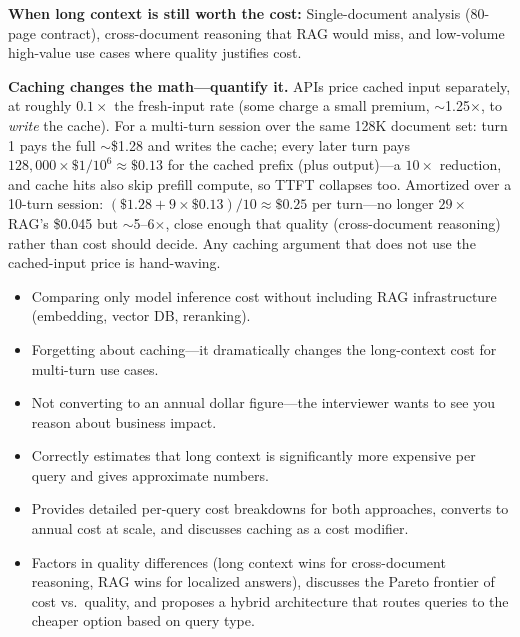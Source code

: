\begin{interviewq}
\textbf{When long context is still worth the cost:} Single-document analysis (80-page contract), cross-document reasoning that RAG would miss, and low-volume high-value use cases where quality justifies cost.

\textbf{Caching changes the math---quantify it.} APIs price cached input separately, at roughly $0.1\times$ the fresh-input rate (some charge a small premium, $\sim$1.25$\times$, to \textit{write} the cache). For a multi-turn session over the same 128K document set: turn 1 pays the full $\sim$\$1.28 and writes the cache; every later turn pays $128{,}000 \times \$1/10^6 \approx \$0.13$ for the cached prefix (plus output)---a $10\times$ reduction, and cache hits also skip prefill compute, so TTFT collapses too. Amortized over a 10-turn session: $(\$1.28 + 9 \times \$0.13)/10 \approx \$0.25$ per turn---no longer $29\times$ RAG's \$0.045 but $\sim$5--6$\times$, close enough that quality (cross-document reasoning) rather than cost should decide. Any caching argument that does not use the cached-input price is hand-waving.

\redflags
\begin{itemize}
    \item Comparing only model inference cost without including RAG infrastructure (embedding, vector DB, reranking).
    \item Forgetting about caching---it dramatically changes the long-context cost for multi-turn use cases.
    \item Not converting to an annual dollar figure---the interviewer wants to see you reason about business impact.
\end{itemize}


\goodgreat
\begin{itemize}
    \item {} Correctly estimates that long context is significantly more expensive per query and gives approximate numbers.
    \item {} Provides detailed per-query cost breakdowns for both approaches, converts to annual cost at scale, and discusses caching as a cost modifier.
    \item {} Factors in quality differences (long context wins for cross-document reasoning, RAG wins for localized answers), discusses the Pareto frontier of cost vs.\ quality, and proposes a hybrid architecture that routes queries to the cheaper option based on query type.
\end{itemize}

\end{interviewq}

